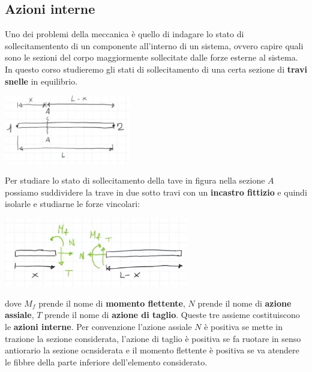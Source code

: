 \subsection{Azioni interne}
Uno dei problemi della meccanica è quello di indagare lo stato di sollecitamentento di un componente all'interno di un sistema, ovvero capire quali sono le sezioni del corpo maggiormente sollecitate dalle forze esterne al sistema.\newline
\newline
In questo corso studieremo gli stati di sollecitamento di una certa sezione di \textbf{travi snelle} in equilibrio.\newline
{}
\begin{center}
    \includegraphics[height=3cm]{../lezione7/img7.JPG}
\end{center}
Per studiare lo stato di sollecitamento della tave in figura nella sezione $A$ possiamo suddividere la trave in due sotto travi con un \textbf{incastro fittizio} e quindi isolarle e studiarne le forze vincolari:
\begin{center}
    \includegraphics[height=3cm]{../lezione7/img8.JPG}
\end{center}
dove $M_f$ prende il nome di \textbf{momento flettente}, $N$ prende il nome di \textbf{azione assiale}, $T$ prende il nome di \textbf{azione di taglio}. Queste tre assieme costituiscono le \textbf{azioni interne}.\newline
\newline
Per convenzione l'azione assiale $N$ è positiva se mette in trazione la sezione considerata, l'azione di taglio è positiva se fa ruotare in senso antiorario la sezione ocnsiderata e il momento flettente è positiva se va atendere le fibbre della parte inferiore dell'elemento considerato.\newline
